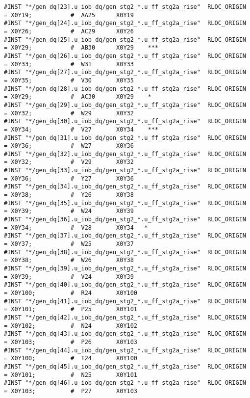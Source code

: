 \begin{verbatim}
#INST "*/gen_dq[23].u_iob_dq/gen_stg2_*.u_ff_stg2a_rise"  RLOC_ORIGIN = X0Y19;           #  AA25      X0Y19    
#INST "*/gen_dq[24].u_iob_dq/gen_stg2_*.u_ff_stg2a_rise"  RLOC_ORIGIN = X0Y26;           #  AC29      X0Y26    
#INST "*/gen_dq[25].u_iob_dq/gen_stg2_*.u_ff_stg2a_rise"  RLOC_ORIGIN = X0Y29;           #  AB30      X0Y29    ***
#INST "*/gen_dq[26].u_iob_dq/gen_stg2_*.u_ff_stg2a_rise"  RLOC_ORIGIN = X0Y33;           #  W31       X0Y33    
#INST "*/gen_dq[27].u_iob_dq/gen_stg2_*.u_ff_stg2a_rise"  RLOC_ORIGIN = X0Y35;           #  V30       X0Y35    
#INST "*/gen_dq[28].u_iob_dq/gen_stg2_*.u_ff_stg2a_rise"  RLOC_ORIGIN = X0Y29;           #  AC30      X0Y29    *
#INST "*/gen_dq[29].u_iob_dq/gen_stg2_*.u_ff_stg2a_rise"  RLOC_ORIGIN = X0Y32;           #  W29       X0Y32    
#INST "*/gen_dq[30].u_iob_dq/gen_stg2_*.u_ff_stg2a_rise"  RLOC_ORIGIN = X0Y34;           #  V27       X0Y34    ***
#INST "*/gen_dq[31].u_iob_dq/gen_stg2_*.u_ff_stg2a_rise"  RLOC_ORIGIN = X0Y36;           #  W27       X0Y36    
#INST "*/gen_dq[32].u_iob_dq/gen_stg2_*.u_ff_stg2a_rise"  RLOC_ORIGIN = X0Y32;           #  V29       X0Y32    
#INST "*/gen_dq[33].u_iob_dq/gen_stg2_*.u_ff_stg2a_rise"  RLOC_ORIGIN = X0Y36;           #  Y27       X0Y36    
#INST "*/gen_dq[34].u_iob_dq/gen_stg2_*.u_ff_stg2a_rise"  RLOC_ORIGIN = X0Y38;           #  Y26       X0Y38    
#INST "*/gen_dq[35].u_iob_dq/gen_stg2_*.u_ff_stg2a_rise"  RLOC_ORIGIN = X0Y39;           #  W24       X0Y39    
#INST "*/gen_dq[36].u_iob_dq/gen_stg2_*.u_ff_stg2a_rise"  RLOC_ORIGIN = X0Y34;           #  V28       X0Y34   * 
#INST "*/gen_dq[37].u_iob_dq/gen_stg2_*.u_ff_stg2a_rise"  RLOC_ORIGIN = X0Y37;           #  W25       X0Y37    
#INST "*/gen_dq[38].u_iob_dq/gen_stg2_*.u_ff_stg2a_rise"  RLOC_ORIGIN = X0Y38;           #  W26       X0Y38    
#INST "*/gen_dq[39].u_iob_dq/gen_stg2_*.u_ff_stg2a_rise"  RLOC_ORIGIN = X0Y39;           #  V24       X0Y39    
#INST "*/gen_dq[40].u_iob_dq/gen_stg2_*.u_ff_stg2a_rise"  RLOC_ORIGIN = X0Y100;          #  R24       X0Y100   
#INST "*/gen_dq[41].u_iob_dq/gen_stg2_*.u_ff_stg2a_rise"  RLOC_ORIGIN = X0Y101;          #  P25       X0Y101   
#INST "*/gen_dq[42].u_iob_dq/gen_stg2_*.u_ff_stg2a_rise"  RLOC_ORIGIN = X0Y102;          #  N24       X0Y102   
#INST "*/gen_dq[43].u_iob_dq/gen_stg2_*.u_ff_stg2a_rise"  RLOC_ORIGIN = X0Y103;          #  P26       X0Y103   
#INST "*/gen_dq[44].u_iob_dq/gen_stg2_*.u_ff_stg2a_rise"  RLOC_ORIGIN = X0Y100;          #  T24       X0Y100   
#INST "*/gen_dq[45].u_iob_dq/gen_stg2_*.u_ff_stg2a_rise"  RLOC_ORIGIN = X0Y101;          #  N25       X0Y101   
#INST "*/gen_dq[46].u_iob_dq/gen_stg2_*.u_ff_stg2a_rise"  RLOC_ORIGIN = X0Y103;          #  P27       X0Y103   

\end{verbatim}
